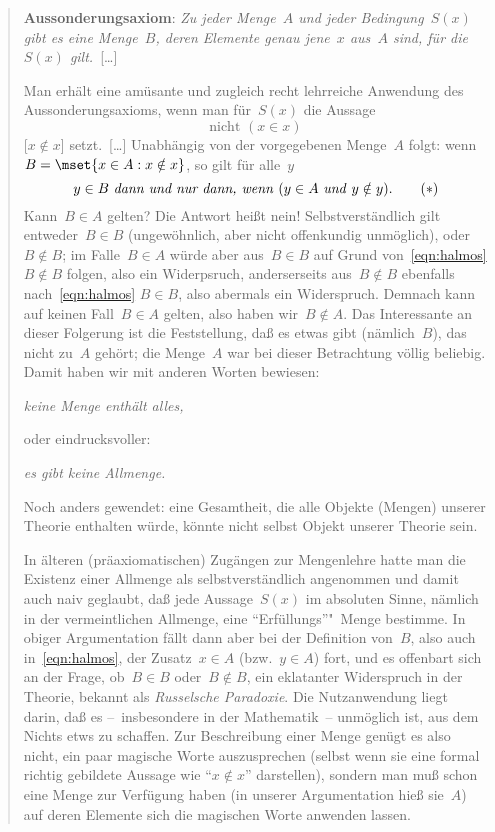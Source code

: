 \documentclass[a4paper]{article}
\begin{document}
\begin{quotation}
    \textbf{Aussonderungsaxiom}: \emph{Zu jeder Menge~$A$ und jeder Bedingung~$S(x)$ gibt es eine Menge~$B$, deren Elemente genau jene~$x$ aus~$A$ sind, für die~$S(x)$ gilt.}~[\dots]

    Man erhält eine amüsante und zugleich recht lehrreiche Anwendung des Aussonderungsaxioms, wenn man für~$S(x)$ die Aussage
    \begin{equation*}
        \text{nicht } (x \in x)
    \end{equation*}
    [$x \notin x$] setzt.~[\dots] Unabhängig von der vorgegebenen Menge~$A$ folgt: wenn $B = \mset{x \in A : x \notin x}$, so gilt für alle~$y$
    \begin{equation}
        y \in B \text{ \emph{dann und nur dann, wenn} } (y \in A \text{ \emph{und} } y \notin y). \tag*{$(*)$}\label{eqn:halmos}
    \end{equation}
    Kann~$B \in A$ gelten? Die Antwort heißt nein! Selbstverständlich gilt entweder~$B \in B$ (ungewöhnlich, aber nicht offenkundig unmöglich), oder~$B \notin B$; im Falle~$B \in A$ würde aber aus~$B \in B$ auf Grund von~\ref{eqn:halmos} $B \notin B$ folgen, also ein Widerpsruch, anderserseits aus~$B \notin B$ ebenfalls nach~\ref{eqn:halmos} $B \in B$, also abermals ein Widerspruch. Demnach kann auf keinen Fall~$B \in A$ gelten, also haben wir~$B \notin A$. Das Interessante an dieser Folgerung ist die Feststellung, daß es etwas gibt (nämlich~$B$), das nicht zu~$A$ gehört; die Menge~$A$ war bei dieser Betrachtung völlig beliebig. Damit haben wir mit anderen Worten bewiesen:
    \begin{center}
        \textit{keine Menge enthält alles,}
    \end{center}
    oder eindrucksvoller:
    \begin{center}
        \textit{es gibt keine Allmenge.}
    \end{center}
    Noch anders gewendet: eine Gesamtheit, die alle Objekte (Mengen) unserer Theorie enthalten würde, könnte nicht selbst Objekt unserer Theorie sein.

    In älteren (präaxiomatischen) Zugängen zur Mengenlehre hatte man die Existenz einer Allmenge als selbstverständlich angenommen und damit auch naiv geglaubt, daß jede Aussage~$S(x)$ im absoluten Sinne, nämlich in der vermeintlichen Allmenge, eine "`Erfüllungs"'"~Menge bestimme. In obiger Argumentation fällt dann aber bei der Definition von~$B$, also auch in~\ref{eqn:halmos}, der Zusatz~$x \in A$ (bzw.~$y \in A$) fort, und es offenbart sich an der Frage, ob~$B \in B$ oder~$B \notin B$, ein eklatanter Widerspruch in der Theorie, bekannt als \emph{Russelsche Paradoxie}. Die Nutzanwendung liegt darin, daß es --~insbesondere in der Mathematik~-- unmöglich ist, aus dem Nichts etws zu schaffen. Zur Beschreibung einer Menge genügt es also nicht, ein paar magische Worte auszusprechen (selbst wenn sie eine formal richtig gebildete Aussage wie "`$x \notin x$"' darstellen), sondern man muß schon eine Menge zur Verfügung haben (in unserer Argumentation hieß sie~$A$) auf deren Elemente sich die magischen Worte anwenden lassen.
\end{quotation}
\end{document}
